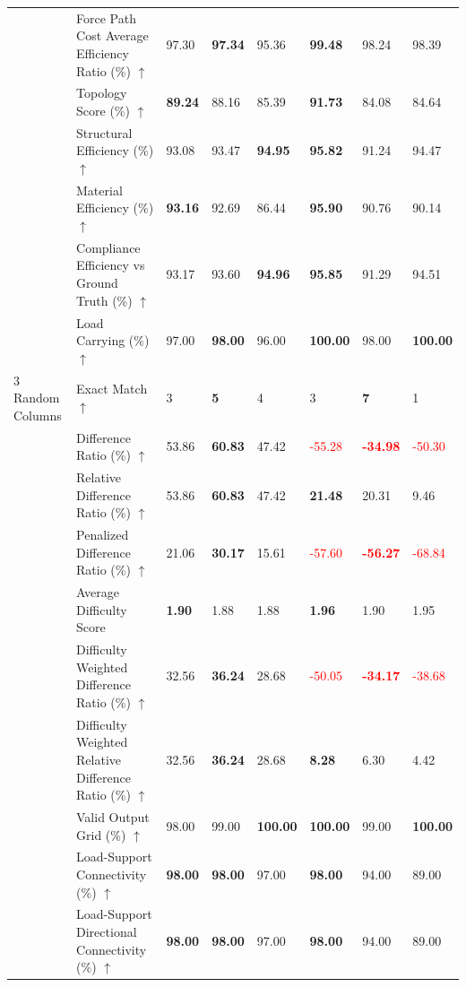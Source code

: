 \begin{table}[!h]
{\begin{tabular}{lllll|lll}
 & Force Path Cost Average Efficiency Ratio (\%) $\uparrow$ & 97.30 & \textbf{97.34} & 95.36 & \textbf{99.48} & 98.24 & 98.39 \\
 & Topology Score (\%) $\uparrow$ & \textbf{89.24} & 88.16 & 85.39 & \textbf{91.73} & 84.08 & 84.64 \\
 & Structural Efficiency (\%) $\uparrow$ & 93.08 & 93.47 & \textbf{94.95} & \textbf{95.82} & 91.24 & 94.47 \\
 & Material Efficiency (\%) $\uparrow$ & \textbf{93.16} & 92.69 & 86.44 & \textbf{95.90} & 90.76 & 90.14 \\
 & Compliance Efficiency vs Ground Truth (\%) $\uparrow$ & 93.17 & 93.60 & \textbf{94.96} & \textbf{95.85} & 91.29 & 94.51 \\
 & Load Carrying (\%) $\uparrow$ & 97.00 & \textbf{98.00} & 96.00 & \textbf{100.00} & 98.00 & \textbf{100.00} \\
\midrule
3 Random Columns & Exact Match $\uparrow$ & 3 & \textbf{5} & 4 & 3 & \textbf{7} & 1 \\
 & Difference Ratio (\%) $\uparrow$ & 53.86 & \textbf{60.83} & 47.42 & \textcolor{red}{-55.28} & \textbf{\textcolor{red}{-34.98}} & \textcolor{red}{-50.30} \\
 & Relative Difference Ratio (\%) $\uparrow$ & 53.86 & \textbf{60.83} & 47.42 & \textbf{21.48} & 20.31 & 9.46 \\
 & Penalized Difference Ratio (\%) $\uparrow$ & 21.06 & \textbf{30.17} & 15.61 & \textcolor{red}{-57.60} & \textbf{\textcolor{red}{-56.27}} & \textcolor{red}{-68.84} \\
 & Average Difficulty Score & \textbf{1.90} & 1.88 & 1.88 & \textbf{1.96} & 1.90 & 1.95 \\
 & Difficulty Weighted Difference Ratio (\%) $\uparrow$ & 32.56 & \textbf{36.24} & 28.68 & \textcolor{red}{-50.05} & \textbf{\textcolor{red}{-34.17}} & \textcolor{red}{-38.68} \\
 & Difficulty Weighted Relative Difference Ratio (\%) $\uparrow$ & 32.56 & \textbf{36.24} & 28.68 & \textbf{8.28} & 6.30 & 4.42 \\
 & Valid Output Grid (\%) $\uparrow$ & 98.00 & 99.00 & \textbf{100.00} & \textbf{100.00} & 99.00 & \textbf{100.00} \\
 & Load-Support Connectivity (\%) $\uparrow$ & \textbf{98.00} & \textbf{98.00} & 97.00 & \textbf{98.00} & 94.00 & 89.00 \\
 & Load-Support Directional Connectivity (\%) $\uparrow$ & \textbf{98.00} & \textbf{98.00} & 97.00 & \textbf{98.00} & 94.00 & 89.00 \\

\end{tabular}}
\end{table}
